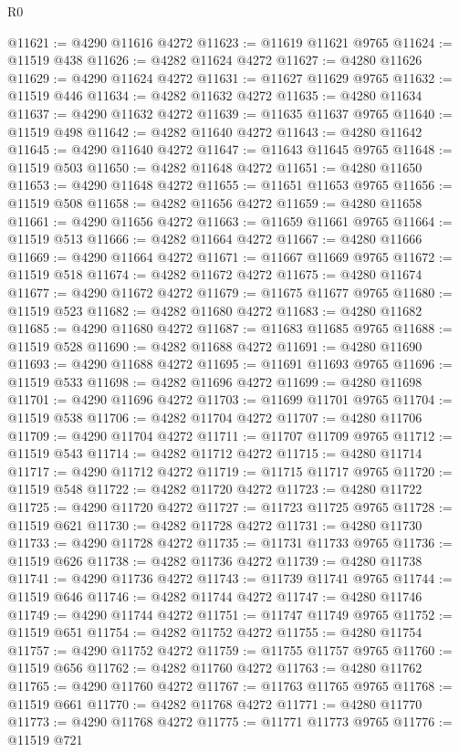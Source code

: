 \begin{lexlean}{R0}
\begin{coremodule}
@11621 := @4290 @11616 @4272
@11623 := @11619 @11621 @9765
@11624 := @11519 @438
@11626 := @4282 @11624 @4272
@11627 := @4280 @11626
@11629 := @4290 @11624 @4272
@11631 := @11627 @11629 @9765
@11632 := @11519 @446
@11634 := @4282 @11632 @4272
@11635 := @4280 @11634
@11637 := @4290 @11632 @4272
@11639 := @11635 @11637 @9765
@11640 := @11519 @498
@11642 := @4282 @11640 @4272
@11643 := @4280 @11642
@11645 := @4290 @11640 @4272
@11647 := @11643 @11645 @9765
@11648 := @11519 @503
@11650 := @4282 @11648 @4272
@11651 := @4280 @11650
@11653 := @4290 @11648 @4272
@11655 := @11651 @11653 @9765
@11656 := @11519 @508
@11658 := @4282 @11656 @4272
@11659 := @4280 @11658
@11661 := @4290 @11656 @4272
@11663 := @11659 @11661 @9765
@11664 := @11519 @513
@11666 := @4282 @11664 @4272
@11667 := @4280 @11666
@11669 := @4290 @11664 @4272
@11671 := @11667 @11669 @9765
@11672 := @11519 @518
@11674 := @4282 @11672 @4272
@11675 := @4280 @11674
@11677 := @4290 @11672 @4272
@11679 := @11675 @11677 @9765
@11680 := @11519 @523
@11682 := @4282 @11680 @4272
@11683 := @4280 @11682
@11685 := @4290 @11680 @4272
@11687 := @11683 @11685 @9765
@11688 := @11519 @528
@11690 := @4282 @11688 @4272
@11691 := @4280 @11690
@11693 := @4290 @11688 @4272
@11695 := @11691 @11693 @9765
@11696 := @11519 @533
@11698 := @4282 @11696 @4272
@11699 := @4280 @11698
@11701 := @4290 @11696 @4272
@11703 := @11699 @11701 @9765
@11704 := @11519 @538
@11706 := @4282 @11704 @4272
@11707 := @4280 @11706
@11709 := @4290 @11704 @4272
@11711 := @11707 @11709 @9765
@11712 := @11519 @543
@11714 := @4282 @11712 @4272
@11715 := @4280 @11714
@11717 := @4290 @11712 @4272
@11719 := @11715 @11717 @9765
@11720 := @11519 @548
@11722 := @4282 @11720 @4272
@11723 := @4280 @11722
@11725 := @4290 @11720 @4272
@11727 := @11723 @11725 @9765
@11728 := @11519 @621
@11730 := @4282 @11728 @4272
@11731 := @4280 @11730
@11733 := @4290 @11728 @4272
@11735 := @11731 @11733 @9765
@11736 := @11519 @626
@11738 := @4282 @11736 @4272
@11739 := @4280 @11738
@11741 := @4290 @11736 @4272
@11743 := @11739 @11741 @9765
@11744 := @11519 @646
@11746 := @4282 @11744 @4272
@11747 := @4280 @11746
@11749 := @4290 @11744 @4272
@11751 := @11747 @11749 @9765
@11752 := @11519 @651
@11754 := @4282 @11752 @4272
@11755 := @4280 @11754
@11757 := @4290 @11752 @4272
@11759 := @11755 @11757 @9765
@11760 := @11519 @656
@11762 := @4282 @11760 @4272
@11763 := @4280 @11762
@11765 := @4290 @11760 @4272
@11767 := @11763 @11765 @9765
@11768 := @11519 @661
@11770 := @4282 @11768 @4272
@11771 := @4280 @11770
@11773 := @4290 @11768 @4272
@11775 := @11771 @11773 @9765
@11776 := @11519 @721

\end{coremodule}
\end{lexlean}
